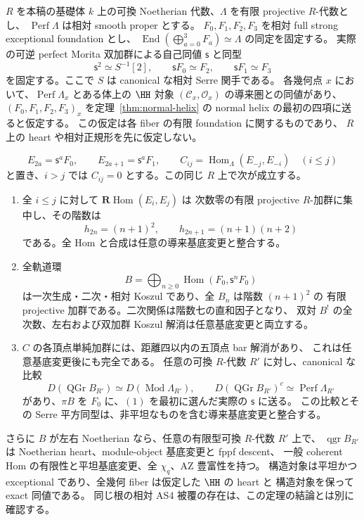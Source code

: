 \begin{theorem}
\label{thm:uniform-orbit-from-normal-fibers}
$R$ を本稿の基礎体 $k$ 上の可換 Noetherian 代数、$\Lambda$ を有限 projective $R$-代数とし、
$\operatorname{Perf}\Lambda$ は相対 smooth proper とする。
$F_0,F_1,F_2,F_3$ を相対 full strong exceptional foundation とし、
$\operatorname{End}(\bigoplus_{a=0}^3F_a)\simeq\Lambda$ の同定を固定する。
実際の可逆 perfect Morita 双加群による自己同値 $\mathsf s$ と同型
\[
 \mathsf s^2\simeq S^{-1}[2],\qquad
 \mathsf sF_0\simeq F_2,\qquad \mathsf sF_1\simeq F_3
\]
を固定する。ここで $S$ は canonical な相対 Serre 関手である。
各幾何点 $x$ において、$\operatorname{Perf}\Lambda_x$ とある体上の
$\HH$ 対象 $(\mathcal C_x,\mathcal O_x)$ の導来圏との同値があり、
$(F_0,F_1,F_2,F_3)_x$ を定理~\ref{thm:normal-helix} の
normal helix の最初の四項に送ると仮定する。
この仮定は各 fiber の有限 foundation に関するものであり、
$R$ 上の heart や相対正規形を先に仮定しない。

\[
 E_{2a}=\mathsf s^aF_0,\qquad E_{2a+1}=\mathsf s^aF_1,
 \qquad C_{ij}=\operatorname{Hom}_{\Lambda}(E_{-j},E_{-i})\quad(i\le j)
\]
と置き、$i>j$ では $C_{ij}=0$ とする。この同じ $R$ 上で次が成立する。
\begin{enumerate}
\item 全 $i\le j$ に対して $\mathbf R\operatorname{Hom}(E_i,E_j)$ は
  次数零の有限 projective $R$-加群に集中し、その階数は
  \[
  h_{2n}=(n+1)^2,\qquad h_{2n+1}=(n+1)(n+2)
  \]
  である。全 Hom と合成は任意の導来基底変更と整合する。
\item 全軌道環
  \[
  B=\bigoplus_{n\ge0}\operatorname{Hom}(F_0,\mathsf s^nF_0)
  \]
  は一次生成・二次・相対 Koszul であり、全 $B_n$ は階数 $(n+1)^2$ の
  有限 projective 加群である。二次関係は階数七の直和因子となり、
  双対 $B^!$ の全次数、左右および双加群 Koszul 解消は任意基底変更と両立する。
\item $C$ の各頂点単純加群には、距離四以内の五頂点 bar 解消があり、
  これは任意基底変更後にも完全である。
  任意の可換 $R$-代数 $R'$ に対し、canonical な比較
  \[
  D(\operatorname{QGr}B_{R'})\simeq D(\operatorname{Mod}\Lambda_{R'}),
  \qquad D(\operatorname{QGr}B_{R'})^c\simeq\operatorname{Perf}\Lambda_{R'}
  \]
  があり、$\pi B$ を $F_0$ に、$(1)$ を最初に選んだ実際の $\mathsf s$ に送る。
  この比較とその Serre 平方同型は、非平坦なものを含む導来基底変更と整合する。
\end{enumerate}
さらに $B$ が左右 Noetherian なら、任意の有限型可換 $R$-代数 $R'$ 上で、
$\operatorname{qgr}B_{R'}$ は Noetherian heart、module-object 基底変更と fppf descent、
一般 coherent Hom の有限性と平坦基底変更、全 $\chi_q$、AZ 豊富性を持つ。
構造対象は平坦かつ exceptional であり、全幾何 fiber は仮定した $\HH$ の heart と
構造対象を保って exact 同値である。
同じ根の相対 AS4 被覆の存在は、この定理の結論とは別に確認する。
\end{theorem}


